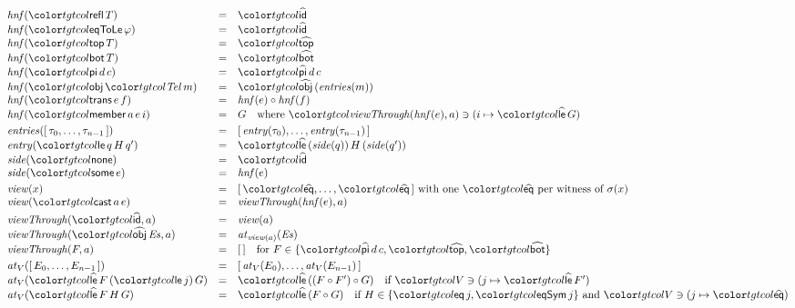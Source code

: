 \begin{figure}[t]
\small
\color{tgtcol}
\[
\begin{array}{@{}lcl@{}}
\mathit{hnf}(\ev{refl}\,T) & = & \form{id} \\
\mathit{hnf}(\ev{eqToLe}\,\varphi) & = & \form{id} \\
\mathit{hnf}(\ev{top}\,T) & = & \form{top} \\
\mathit{hnf}(\ev{bot}\,T) & = & \form{bot} \\
\mathit{hnf}(\ev{pi}\,d\,c) & = & \form{pi}\,d\,c \\
\mathit{hnf}(\ev{obj}\,\tel\,m) & = & \form{obj}\,(\mathit{entries}(m)) \\
\mathit{hnf}(\ev{trans}\,e\,f) & = & \mathit{hnf}(e) \circ \mathit{hnf}(f) \\
\mathit{hnf}(\ev{member}\,a\,e\,i) & = & G \quad \text{where } \tat{\mathit{viewThrough}(\mathit{hnf}(e), a)}{i}{\form{le}\,G} \\[3pt]
\mathit{entries}([\,\tau_0, \ldots, \tau_{n-1}\,]) & = & [\,\mathit{entry}(\tau_0), \ldots, \mathit{entry}(\tau_{n-1})\,] \\
\mathit{entry}(\ev{le}\,q\,H\,q') & = & \form{le}\,(\mathit{side}(q))\,H\,(\mathit{side}(q')) \\
\mathit{side}(\ev{none}) & = & \form{id} \\
\mathit{side}(\ev{some}\,e) & = & \mathit{hnf}(e) \\[3pt]
\mathit{view}(x) & = & [\,\form{eq}, \ldots, \form{eq}\,] \text{ with one } \form{eq} \text{ per witness of } \sigma(x) \\
\mathit{view}(\ev{cast}\,a\,e) & = & \mathit{viewThrough}(\mathit{hnf}(e), a) \\[3pt]
\mathit{viewThrough}(\form{id}, a) & = & \mathit{view}(a) \\
\mathit{viewThrough}(\form{obj}\,\mathit{Es}, a) & = & \mathit{at}_{\mathit{view}(a)}(\mathit{Es}) \\
\mathit{viewThrough}(F, a) & = & \tnil \quad \text{for } F \in \{\form{pi}\,d\,c, \form{top}, \form{bot}\} \\[3pt]
\mathit{at}_V([\,E_0, \ldots, E_{n-1}\,]) & = & [\,\mathit{at}_V(E_0), \ldots, \mathit{at}_V(E_{n-1})\,] \\
\mathit{at}_V(\form{le}\,F\,(\ev{le}\,j)\,G) & = & \form{le}\,((F \circ F') \circ G) \quad \text{if } \tat{V}{j}{\form{le}\,F'} \\
\mathit{at}_V(\form{le}\,F\,H\,G) & = & \form{le}\,(F \circ G) \quad \text{if } H \in \{\ev{eq}\,j, \ev{eqSym}\,j\} \text{ and } \tat{V}{j}{\form{eq}} \\[3pt]

\end{array}\]
\end{figure}
